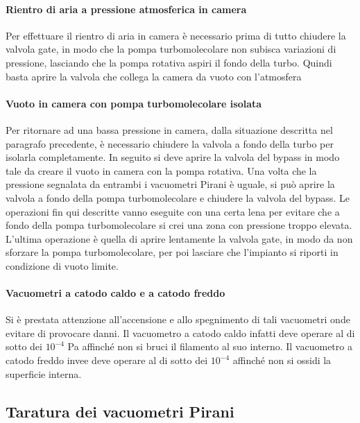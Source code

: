 \paragraph{Rientro di aria a pressione atmosferica in camera\\}
Per effettuare il rientro di aria in camera è necessario prima di tutto chiudere la valvola gate, in modo che la pompa turbomolecolare non subisca variazioni di pressione, lasciando che la pompa rotativa aspiri il fondo della turbo. Quindi basta aprire la valvola che collega la camera da vuoto con l'atmosfera
\paragraph{Vuoto in camera con pompa turbomolecolare isolata\\} %
Per ritornare ad una bassa pressione in camera, dalla situazione descritta nel paragrafo precedente, è necessario chiudere la valvola a fondo della turbo per isolarla completamente. In seguito si deve aprire la valvola del bypass in modo tale da creare il vuoto in camera con la pompa rotativa. Una volta che la pressione segnalata da entrambi i vacuometri Pirani è uguale, si può aprire la valvola a fondo della pompa turbomolecolare e chiudere la valvola del bypass. Le operazioni fin qui descritte vanno eseguite con una certa lena per evitare che a fondo della pompa turbomolecolare si crei una zona con pressione troppo elevata. L'ultima operazione è quella di aprire lentamente la valvola gate, in modo da non sforzare la pompa turbomolecolare, per poi lasciare che l'impianto si riporti in condizione di vuoto limite. %
\paragraph{Vacuometri a catodo caldo e a catodo freddo\\}
Si è prestata attenzione all'accensione e allo spegnimento di tali vacuometri onde evitare di provocare danni. Il vacuometro a catodo caldo infatti deve operare al di sotto dei $10^{-4}$ \si{\pascal} affinché non si bruci il filamento al suo interno. Il vacuometro a catodo freddo invee deve operare al di sotto dei $10^{-4}$ affinché non si ossidi la superficie interna. %

\subsection{Taratura dei vacuometri Pirani}

